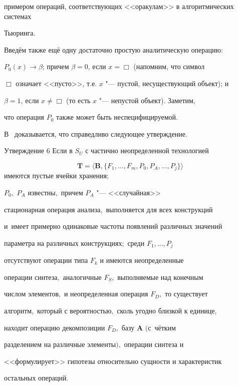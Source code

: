 примером операций, соответствующих <<оракулам>> в алгоритмических системах

Тьюринга.



Введём также ещё одну достаточно простую аналитическую операцию:

$P_{0}(x)\to \beta$; причем $\beta = 0$, если $x= \Box$ (напомним, что символ

$\Box$ означает <<пусто>>, т.е. $x$ "--- пустой, несуществующий объект); и

$\beta = 1$, если $x \ne  \Box$ (то есть $x $ "--- непустой объект). Заметим,

что операция $P_{0}$ также может быть неспецифицируемой.



В~\cite{krylov:bib3} доказывается, что справедливо следующее утверждение.



\smallskip



\hypertarget{kr:utv6}{}



\begin{newthm}{Утверждение 6} Если в $S_{U}$ с частично неопределенной технологией

$$\mathbf{T} = \langle \mathbf{B}, \{F_{1},\ldots, F_{m}, P_{0},

P_{A},\ldots, P_{j}\}\rangle$$ имеются пустые ячейки хранения$;$

$P_0,$ $P_{A}$ известны$,$ причем $P_{A}$ "--- <<случайная>>

стационарная операция анализа$,$ выполняется для всех конструкций 

и~имеет примерно одинаковые частоты появлений различных значений

параметра на различных конструкциях$;$ среди $F_{1},\ldots, P_{j}$

отсутствуют операции типа $F_{k}$ и имеются неопределенные

операции синтеза$,$ аналогичные $F_{S},$ выполняемые над конечным

числом элементов$,$ и неопределенная операция $F_{D},$ то существует

алгоритм$,$ который с вероятностью$,$ сколь угодно близкой к единице$,$

находит операцию декомпозиции $F_{D},$ базу $\mathbf{A}$ $($с~чётким

разделением на различные элементы$),$ операции синтеза и

<<формулирует>> гипотезы относительно сущности и характеристик

остальных операций$.$

\end{newthm}



